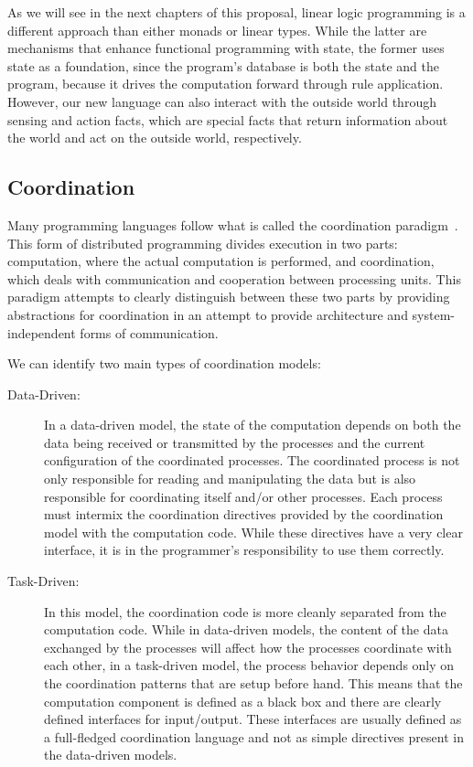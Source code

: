 As we will see in the next chapters of this proposal, linear logic programming is a different approach than either monads or linear types.
While the latter are mechanisms that enhance functional programming with state, the former uses state as a foundation, since
the program's database is both the state and the program, because it drives the computation forward through rule application. However, our
new language can also interact with the outside world through sensing and action facts, which are special facts that return information
about the world and act on the outside world, respectively.

\subsection{Coordination}

Many programming languages follow what is called the coordination paradigm~\cite{Papadopoulos98coordinationmodels}. This form of distributed
programming divides execution in two parts: computation, where the actual computation is performed, and
coordination, which deals with communication and cooperation between processing units. This paradigm attempts to clearly distinguish between
these two parts by providing abstractions for coordination in an attempt to provide architecture and system-independent forms of communication.

We can identify two main types of coordination models:

\begin{description}
   \item[Data-Driven:] In a data-driven model,
the state of the computation depends on both the data being received or transmitted by the processes and the current configuration
of the coordinated processes. The coordinated process is not only responsible for reading and manipulating the data but is also
responsible for coordinating itself and/or other processes. Each process must intermix the coordination directives provided by the coordination
model with the computation code. While these directives have a very clear interface, it is in the programmer's responsibility to use them correctly.

   \item[Task-Driven:] In this model, the coordination code is more cleanly separated from the computation code. While in data-driven models, the content of the data exchanged by the processes will affect how the processes coordinate with each other, in a task-driven model, the process behavior depends only on the coordination patterns that are setup before hand. This means that the computation component is defined as a black box and there are clearly defined interfaces for input/output. These interfaces are usually defined as a full-fledged coordination language and not as
   simple directives present in the data-driven models.
\end{description}


